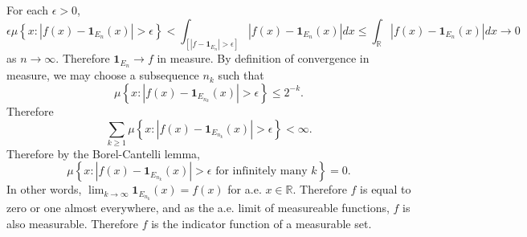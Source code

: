\documentclass[answers]{exam}
\theoremstyle{problemstyle}
\newcommand{\1}[1]{\textbf{1}_{\left[#1\right]}} %
\def\R{\mathbb{R}} %
\begin{document}
\begin{questions}
\begin{solution}
For each $\epsilon>0$, 
\begin{equation*}
  \epsilon \mu \left\{ x: |f(x)-\mathbf{1}_{E_{n}}(x)| >\epsilon \right\}
  <  \int_{\left[|f-\mathbf{1}_{E_{n}}| >\epsilon \right]} |f(x)-\mathbf{1}_{E_{n}}(x)|dx
  \leq \int_{\R} |f(x)-\mathbf{1}_{E_{n}}(x)|dx \to 0
\end{equation*}
as $n\to \infty$.
Therefore $\mathbf{1}_{E_{n}}\to f$ in measure. By definition of convergence in measure, we may choose a subsequence $n_{k}$ such that
\begin{equation*}
  \mu \left\{ x: |f(x)-\mathbf{1}_{E_{n_{k}}}(x)|>\epsilon \right\} \leq 2^{-k}.
\end{equation*}
Therefore
\begin{equation*}
  \sum_{k\geq 1}\mu \left\{ x: |f(x)-\mathbf{1}_{E_{n_{k}}}(x)|>\epsilon \right\}<\infty.
\end{equation*}
Therefore by the Borel-Cantelli lemma,
\begin{equation*}
  \mu \left\{ x: |f(x)-\mathbf{1}_{E_{n_{k}}}(x)|>\epsilon \text{ for infinitely many }k \right\}=0.
\end{equation*}
In other words, $\lim_{k\to \infty} \mathbf{1}_{E_{n_{k}}}(x) = f(x)$ for a.e. $x\in \R$. Therefore $f$ is equal to zero or one almost everywhere, and as the a.e. limit of measureable functions, $f$ is also measurable. Therefore $f$ is the indicator function of a measurable set.

\end{solution}



\end{questions}
\end{document}
